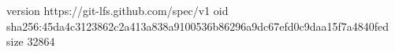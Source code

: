 version https://git-lfs.github.com/spec/v1
oid sha256:45da4c3123862c2a413a838a9100536b86296a9dc67efd0c9daa15f7a4840fed
size 32864

